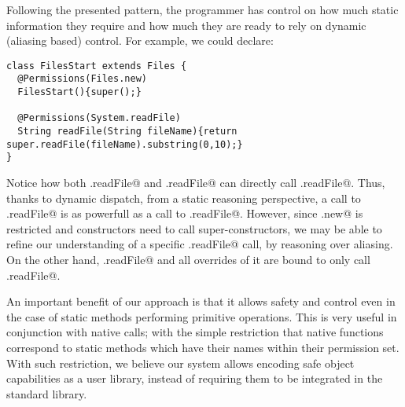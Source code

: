 \documentclass[a4paper,twoside,british,9pt]{extarticle}
\begin{document}
 Following the
presented pattern, the programmer has control on how much static information
they require and how much they are ready to rely on dynamic (aliasing
based) control. For example, we could declare:

\begin{lstlisting}
class FilesStart extends Files {
  @Permissions(Files.new)
  FilesStart(){super();}

  @Permissions(System.readFile)
  String readFile(String fileName){return super.readFile(fileName).substring(0,10);}
}
\end{lstlisting}
Notice how both \Q@Files.readFile@
and \Q@FilesStart.readFile@
can directly call \Q@System.readFile@.
Thus, thanks to dynamic dispatch, from a static reasoning perspective, a call to
\Q@Files.readFile@ is as powerfull as a call
to \Q@System.readFile@.
However, since \Q@Files.new@ is restricted and
constructors need to call super-constructors, we may be able to refine our understanding of a specific  
\Q@Files.readFile@ call, by reasoning over aliasing.
On the other hand, \Q@DocFiles.readFile@ and all overrides of it are bound to
only call \Q@Documents.readFile@.

An important benefit of our approach is that it allows safety and
control even in the case of static methods performing primitive operations.
This is very useful in conjunction with native calls; with the simple restriction
that native functions correspond to static methods which have their names within their permission set.
With such restriction, we believe our system allows encoding safe object capabilities as
a user library, instead of requiring them to be integrated in the
standard library. 
\end{document}
